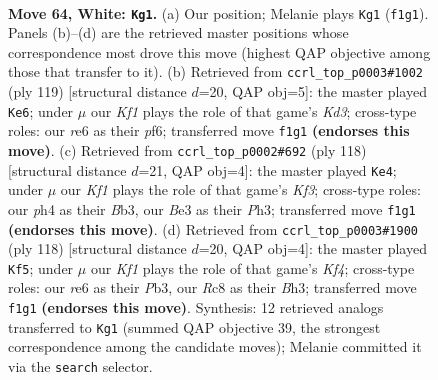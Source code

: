 \documentclass[11pt]{article}
\begin{document}
\clearpage

\begin{figure}[p]\centering
\begin{subfigure}{0.46\textwidth}\centering
\resizebox{\linewidth}{!}{%
\newchessgame
\chessboard[
  setfen={2R5/7k/4r3/8/B3p2p/4Bp1P/b4P2/5K2 w - - 38 64},
  showmover=false,
  pgfstyle=straightmove, color=movearrow, markmove={f1-g1}
]}
\caption{}
\end{subfigure}\hfill
\begin{subfigure}{0.46\textwidth}\centering
\resizebox{\linewidth}{!}{%
\newchessgame
\chessboard[
  setfen={7B/7p/3k1P1P/8/p7/Pb1K4/1P6/8 b - - 18 60},
  showmover=false,
  pgfstyle=straightmove, color=movearrow, markmove={d6-e6}
]}
\caption{}
\end{subfigure}
\\[4pt]
\begin{subfigure}{0.46\textwidth}\centering
\resizebox{\linewidth}{!}{%
\newchessgame
\chessboard[
  setfen={3b1k2/8/4Pp2/6p1/6P1/pB3K1P/8/8 w - - 1 60},
  showmover=false,
  pgfstyle=straightmove, color=movearrow, markmove={f3-e4}
]}
\caption{}
\end{subfigure}\hfill
\begin{subfigure}{0.46\textwidth}\centering
\resizebox{\linewidth}{!}{%
\newchessgame
\chessboard[
  setfen={3k4/5p2/1p6/p1b1P3/P4K1p/1P5B/8/8 w - - 36 60},
  showmover=false,
  pgfstyle=straightmove, color=movearrow, markmove={f4-f5}
]}
\caption{}
\end{subfigure}
\caption{\textbf{Move 64, White: \texttt{Kg1}.} (a) Our position; Melanie plays \texttt{Kg1} (\texttt{f1g1}). Panels (b)--(d) are the retrieved master positions whose correspondence most drove this move (highest QAP objective among those that transfer to it). (b) Retrieved from \texttt{ccrl\_top\_p0003\#1002} (ply 119) [structural distance $d$=20, QAP obj=5]: the master played \texttt{Ke6}; under $\mu$ our \emph{Kf1} plays the role of that game's \emph{Kd3}; cross-type roles: our \emph{r}e6 as their \emph{p}f6; transferred move \texttt{f1g1} \textbf{(endorses this move)}. (c) Retrieved from \texttt{ccrl\_top\_p0002\#692} (ply 118) [structural distance $d$=21, QAP obj=4]: the master played \texttt{Ke4}; under $\mu$ our \emph{Kf1} plays the role of that game's \emph{Kf3}; cross-type roles: our \emph{p}h4 as their \emph{B}b3, our \emph{B}e3 as their \emph{P}h3; transferred move \texttt{f1g1} \textbf{(endorses this move)}. (d) Retrieved from \texttt{ccrl\_top\_p0003\#1900} (ply 118) [structural distance $d$=20, QAP obj=4]: the master played \texttt{Kf5}; under $\mu$ our \emph{Kf1} plays the role of that game's \emph{Kf4}; cross-type roles: our \emph{r}e6 as their \emph{P}b3, our \emph{R}c8 as their \emph{B}h3; transferred move \texttt{f1g1} \textbf{(endorses this move)}. Synthesis: 12 retrieved analogs transferred to \texttt{Kg1} (summed QAP objective 39, the strongest correspondence among the candidate moves); Melanie committed it via the \texttt{search} selector.}
\label{fig:thought-m126}
\end{figure}
\end{document}
